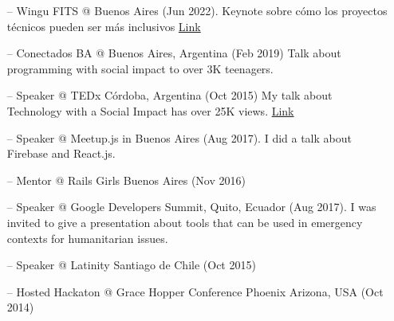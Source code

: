 \documentclass[a4paper,12pt]{article}
\begin{document}
\begin{itemize}[nosep,after=\strut, leftmargin=1em, itemsep=3pt]
  \item[--] Wingu FITS @ Buenos Aires (Jun 2022). Keynote sobre cómo los proyectos técnicos pueden ser más inclusivos \href{https://www.youtube.com/watch?v=1vu4bFradGI&t=3s&ab_channel=Winguchannel}{Link}
    \item[--]  Conectados BA @ Buenos Aires, Argentina (Feb 2019) Talk about programming with social impact to over 3K teenagers.
    \item[--] Speaker @ TEDx Córdoba, Argentina (Oct 2015) My talk about Technology with a Social Impact has over 25K views. \href{https://www.youtube.com/watch?v=0cx8UwdN-g4&t=1s&ab_channel=TEDxTalks}{Link}
    \item[--] Speaker @ Meetup.js in Buenos Aires (Aug 2017). I did a talk about Firebase and React.js. 
    \item[--]  Mentor @ Rails Girls Buenos Aires (Nov 2016)
    \item[--] Speaker @ Google Developers Summit, Quito, Ecuador (Aug 2017). I was invited to give a presentation about tools that can be used in emergency contexts for humanitarian issues.
    \item[--] Speaker @ Latinity Santiago de Chile (Oct 2015)
    \item[--] Hosted Hackaton @ Grace Hopper Conference Phoenix Arizona, USA (Oct 2014)
\end{itemize}










\vfill
{}
\end{document}
